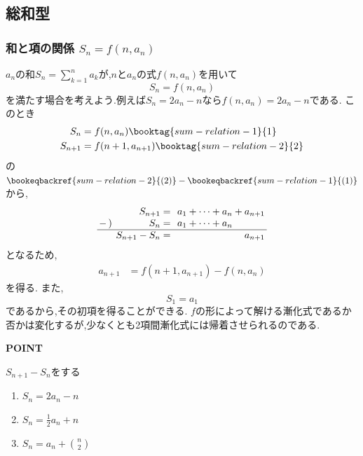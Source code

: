     
\subsection{総和型}\label{節：総和型}
  \subsubsection{\texorpdfstring{和と項の関係  $S_n=f(n,a_n)$}{和と項の関係}}
    $a_n$の和$S_n=\sum_{k=1}^n a_k$が,$n$と$a_n$の式$f(n,a_n)$を用いて
    \[
      S_n=f(n,a_n)
    \]
    を満たす場合を考えよう.例えば$S_n=2a_n-n$なら$f(n,a_n)=2a_n-n$である.
    このとき
    \begin{align*}
      S_n&=f(n,a_n) \booktag{sum-relation-1}{1}\\
      S_{n+1}&=f(n+1,a_{n+1}) \booktag{sum-relation-2}{2}
    \end{align*}
    の$\bookeqbackref{sum-relation-2}{(2)}-\bookeqbackref{sum-relation-1}{(1)}$から,
    \[
      \setlength{\arraycolsep}{2pt}
      \begin{array}{rrl}
        &S_{n+1}={}&a_1+\cdots+a_n+a_{n+1}\\
        -\,)&S_n={}&a_1+\cdots+a_n\\ \hline
        &S_{n+1}-S_n={}&\phantom{a_1+\cdots+a_n+{}}a_{n+1}
      \end{array}
    \]
    となるため,
    \begin{align*}
      a_{n+1}&=f(n+1,a_{n+1})-f(n,a_n)
    \end{align*}
    を得る.
    また,
    \[
      S_1=a_1
    \]
    であるから,その初項を得ることができる.
    $f$の形によって解ける漸化式であるか否かは変化するが,少なくとも2項間漸化式には帰着させられるのである.
    
    \begin{bookpoint}
      \textbf{POINT}\par
      $S_{n+1}-S_n$をする
    \end{bookpoint}
    \noindent {}\par\nobreak
    \begin{enumerate}[label=(\arabic*),parsep=3pt,format=\bookitemlink{example-summation-1}{problem}{hint}]
      \item $S_n=2a_n-n$
      \item $S_n=\frac12a_n+n$
      \item $S_n=a_n+\binom n2$
    \end{enumerate}
    
